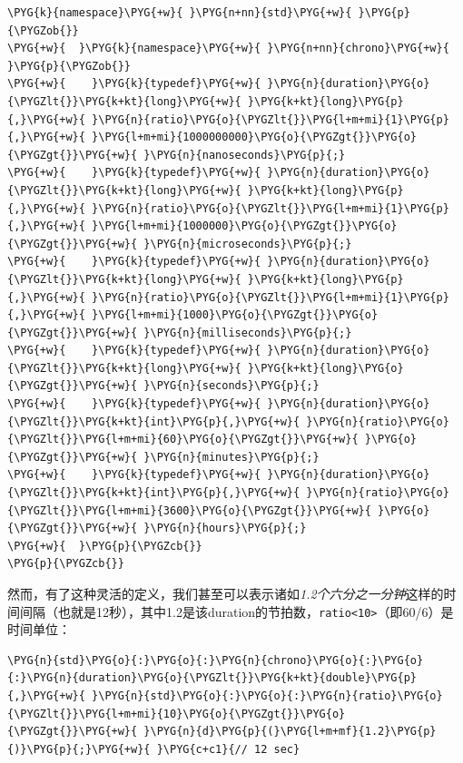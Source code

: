 \begin{codeblockbg}
\begin{Verbatim}[commandchars=\\\{\},breaklines=true,breakanywhere=true,fontsize=\codefont,xleftmargin=17bp]
\PYG{k}{namespace}\PYG{+w}{ }\PYG{n+nn}{std}\PYG{+w}{ }\PYG{p}{\PYGZob{}}
\PYG{+w}{  }\PYG{k}{namespace}\PYG{+w}{ }\PYG{n+nn}{chrono}\PYG{+w}{ }\PYG{p}{\PYGZob{}}
\PYG{+w}{    }\PYG{k}{typedef}\PYG{+w}{ }\PYG{n}{duration}\PYG{o}{\PYGZlt{}}\PYG{k+kt}{long}\PYG{+w}{ }\PYG{k+kt}{long}\PYG{p}{,}\PYG{+w}{ }\PYG{n}{ratio}\PYG{o}{\PYGZlt{}}\PYG{l+m+mi}{1}\PYG{p}{,}\PYG{+w}{ }\PYG{l+m+mi}{1000000000}\PYG{o}{\PYGZgt{}}\PYG{o}{\PYGZgt{}}\PYG{+w}{ }\PYG{n}{nanoseconds}\PYG{p}{;}
\PYG{+w}{    }\PYG{k}{typedef}\PYG{+w}{ }\PYG{n}{duration}\PYG{o}{\PYGZlt{}}\PYG{k+kt}{long}\PYG{+w}{ }\PYG{k+kt}{long}\PYG{p}{,}\PYG{+w}{ }\PYG{n}{ratio}\PYG{o}{\PYGZlt{}}\PYG{l+m+mi}{1}\PYG{p}{,}\PYG{+w}{ }\PYG{l+m+mi}{1000000}\PYG{o}{\PYGZgt{}}\PYG{o}{\PYGZgt{}}\PYG{+w}{ }\PYG{n}{microseconds}\PYG{p}{;}
\PYG{+w}{    }\PYG{k}{typedef}\PYG{+w}{ }\PYG{n}{duration}\PYG{o}{\PYGZlt{}}\PYG{k+kt}{long}\PYG{+w}{ }\PYG{k+kt}{long}\PYG{p}{,}\PYG{+w}{ }\PYG{n}{ratio}\PYG{o}{\PYGZlt{}}\PYG{l+m+mi}{1}\PYG{p}{,}\PYG{+w}{ }\PYG{l+m+mi}{1000}\PYG{o}{\PYGZgt{}}\PYG{o}{\PYGZgt{}}\PYG{+w}{ }\PYG{n}{milliseconds}\PYG{p}{;}
\PYG{+w}{    }\PYG{k}{typedef}\PYG{+w}{ }\PYG{n}{duration}\PYG{o}{\PYGZlt{}}\PYG{k+kt}{long}\PYG{+w}{ }\PYG{k+kt}{long}\PYG{o}{\PYGZgt{}}\PYG{+w}{ }\PYG{n}{seconds}\PYG{p}{;}
\PYG{+w}{    }\PYG{k}{typedef}\PYG{+w}{ }\PYG{n}{duration}\PYG{o}{\PYGZlt{}}\PYG{k+kt}{int}\PYG{p}{,}\PYG{+w}{ }\PYG{n}{ratio}\PYG{o}{\PYGZlt{}}\PYG{l+m+mi}{60}\PYG{o}{\PYGZgt{}}\PYG{+w}{ }\PYG{o}{\PYGZgt{}}\PYG{+w}{ }\PYG{n}{minutes}\PYG{p}{;}
\PYG{+w}{    }\PYG{k}{typedef}\PYG{+w}{ }\PYG{n}{duration}\PYG{o}{\PYGZlt{}}\PYG{k+kt}{int}\PYG{p}{,}\PYG{+w}{ }\PYG{n}{ratio}\PYG{o}{\PYGZlt{}}\PYG{l+m+mi}{3600}\PYG{o}{\PYGZgt{}}\PYG{+w}{ }\PYG{o}{\PYGZgt{}}\PYG{+w}{ }\PYG{n}{hours}\PYG{p}{;}
\PYG{+w}{  }\PYG{p}{\PYGZcb{}}
\PYG{p}{\PYGZcb{}}
\end{Verbatim}
\end{codeblockbg}



然而，有了这种灵活的定义，我们甚至可以表示诸如\textit{1.2个六分之一}\textit{分钟}这样的时间间隔（也就是12秒），其中1.2是该duration的节拍数，\texttt{ratio<\allowbreak{}10>}（即60/6）是时间单位：



\begin{codeblockbg}
\begin{Verbatim}[commandchars=\\\{\},breaklines=true,breakanywhere=true,fontsize=\codefont,xleftmargin=17bp]
\PYG{n}{std}\PYG{o}{:}\PYG{o}{:}\PYG{n}{chrono}\PYG{o}{:}\PYG{o}{:}\PYG{n}{duration}\PYG{o}{\PYGZlt{}}\PYG{k+kt}{double}\PYG{p}{,}\PYG{+w}{ }\PYG{n}{std}\PYG{o}{:}\PYG{o}{:}\PYG{n}{ratio}\PYG{o}{\PYGZlt{}}\PYG{l+m+mi}{10}\PYG{o}{\PYGZgt{}}\PYG{o}{\PYGZgt{}}\PYG{+w}{ }\PYG{n}{d}\PYG{p}{(}\PYG{l+m+mf}{1.2}\PYG{p}{)}\PYG{p}{;}\PYG{+w}{ }\PYG{c+c1}{// 12 sec}
\end{Verbatim}
\end{codeblockbg}


